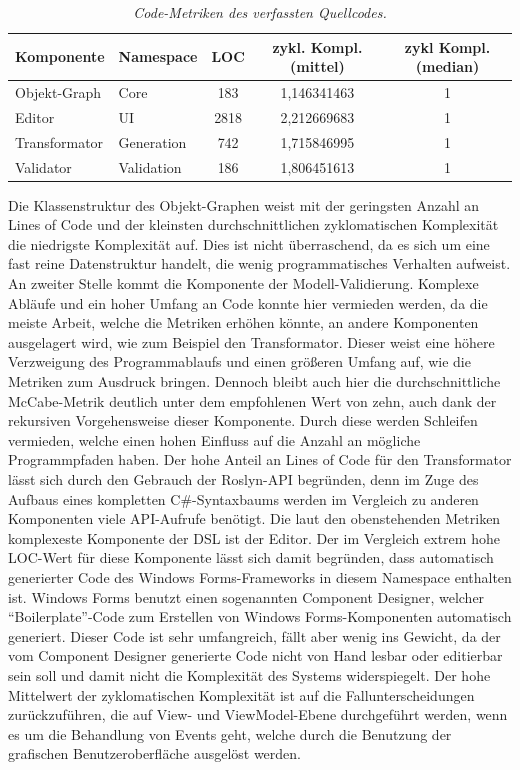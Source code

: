 \begin{table}[hbtp]
\centering
\settowidth{}
\begin{tabulary}{1.0\textwidth}{L|L|C|C|C}
\textbf{Komponente} & \textbf{Namespace} & \textbf{LOC} & \textbf{zykl. Kompl. (mittel)} & \textbf{zykl Kompl. (median)} \\ 
\hline
Objekt-Graph & Core & 183 & 1,146341463 & 1 \\ 
\hline
Editor & UI & 2818 & 2,212669683 & 1 \\ 
\hline
Transformator & Generation & 742 & 1,715846995 & 1 \\ 
\hline
Validator & Validation & 186 & 1,806451613 & 1 \\ 
\end{tabulary}
\caption{\textit{Code-Metriken des verfassten Quellcodes.}}
\label{tab:metrikenGeschriebenerCode}
\end{table}
Die Klassenstruktur des Objekt-Graphen weist mit der geringsten Anzahl an Lines of Code und der kleinsten durchschnittlichen zyklomatischen Komplexität die niedrigste Komplexität auf. Dies ist nicht überraschend, da es sich um eine fast reine Datenstruktur handelt, die wenig programmatisches Verhalten aufweist. An zweiter Stelle kommt die Komponente der Modell-Validierung. Komplexe Abläufe und ein hoher Umfang an Code konnte hier vermieden werden, da die meiste Arbeit, welche die Metriken erhöhen könnte, an andere Komponenten ausgelagert wird, wie zum Beispiel den Transformator. Dieser weist eine höhere Verzweigung des Programmablaufs und einen größeren Umfang auf, wie die Metriken zum Ausdruck bringen. Dennoch bleibt auch hier die durchschnittliche McCabe-Metrik deutlich unter dem empfohlenen Wert von zehn, auch dank der rekursiven Vorgehensweise dieser Komponente. Durch diese werden Schleifen vermieden, welche einen hohen Einfluss auf die Anzahl an mögliche Programmpfaden haben. Der hohe Anteil an Lines of Code für den Transformator lässt sich durch den Gebrauch der Roslyn-API begründen, denn im Zuge des Aufbaus eines kompletten C\#-Syntaxbaums werden im Vergleich zu anderen Komponenten  viele API-Aufrufe benötigt. 
\newline
Die laut den obenstehenden Metriken komplexeste Komponente der DSL ist der Editor. Der im Vergleich extrem hohe LOC-Wert für diese Komponente lässt sich damit begründen, dass automatisch generierter Code des Windows Forms-Frameworks in diesem Namespace enthalten ist. Windows Forms benutzt einen sogenannten Component Designer, welcher ``Boilerplate''-Code zum Erstellen von Windows Forms-Komponenten automatisch generiert. Dieser Code ist sehr umfangreich, fällt aber wenig ins Gewicht, da der vom Component Designer generierte Code nicht von Hand lesbar oder editierbar sein soll und damit nicht die Komplexität des Systems widerspiegelt. Der hohe Mittelwert der zyklomatischen Komplexität ist auf die Fallunterscheidungen zurückzuführen, die auf View- und ViewModel-Ebene durchgeführt werden, wenn es um die Behandlung von Events geht, welche durch die Benutzung der grafischen Benutzeroberfläche ausgelöst werden.
